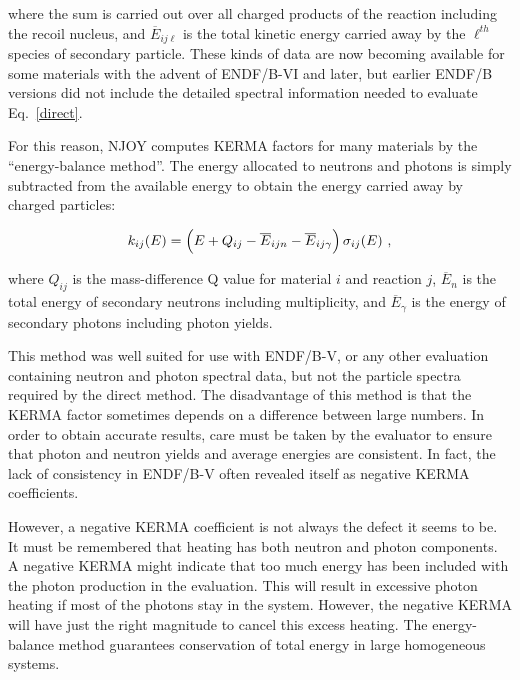 \noindent
where the sum is carried out over all charged products of the reaction
including the recoil nucleus, and $\overline{E}_{ij\ell}$ is the total
kinetic energy carried away by the $\ell^{th}$ species of secondary
particle.  These kinds of data are now becoming available for some
materials with the advent of ENDF/B-VI and later, but earlier
ENDF/B versions did not include the detailed spectral information
needed to evaluate Eq.~\ref{direct}.

For this reason, NJOY computes KERMA factors for many materials by
the ``energy-balance method''\cite{Muir}.
The energy allocated to neutrons and photons is simply subtracted
from the available energy to obtain the energy carried away by
charged particles:

\begin{equation}
   k_{ij}(E)=\Bigl(E+Q_{ij}-\overline{E}_{ijn}-\overline{E}_{ij\gamma}
      \Bigr)\,\sigma_{ij}(E)\,\,,
\label{kij}
\end{equation}
\vspace{0.5 pt}

\noindent
where $Q_{ij}$ is the mass-difference Q value for material $i$ and
reaction $j$, $\overline{E}_n$ is the total energy of secondary
neutrons including multiplicity, and $\overline{E}_\gamma$ is the
energy of secondary photons including photon yields.

This method was well suited for use with ENDF/B-V,
or any other evaluation containing neutron and photon spectral
data, but not the
particle spectra required by the direct method.  The disadvantage
of this method is that the KERMA factor sometimes depends on a
difference between large numbers.  In order to obtain accurate
results, care must be taken by the evaluator to ensure
that photon and neutron yields and average energies are consistent.
In fact, the lack of consistency in ENDF/B-V often revealed itself
as negative KERMA coefficients\cite{ebal}.

However, a negative KERMA coefficient is not always the defect it
seems to be.  It must be remembered that heating has both neutron and
photon components.  A negative KERMA might indicate that too much
energy has been included with the photon production in the evaluation.
This will result in excessive photon heating if most of the photons
stay in the system.  However, the negative KERMA will have just the
right magnitude to cancel this excess heating. The energy-balance
method guarantees conservation of total energy in large homogeneous
systems.

